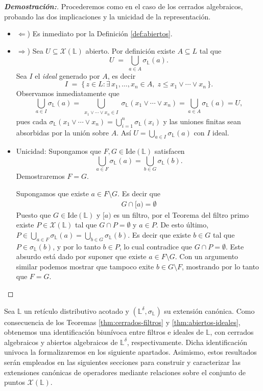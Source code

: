 \documentclass[12pt]{book}
\begin{document}
\begin{proof}[\textbf{Demostración:}]
Procederemos como en el caso de los cerrados algebraicos, probando las dos implicaciones y la unicidad de la representación.

\begin{itemize}
\item \(\Leftarrow\)) Es inmediato por la Definición \ref{def:abiertos}. 

\item \(\Rightarrow\)) Sea \(U\subseteq\mathcal{X}(\mathbb L)\) abierto.
Por definición existe \(A\subseteq L\) tal que
\[
U \;=\; \bigcup_{a\in A}\sigma_{\mathbb{L}}(a).
\]
Sea \(I\) el \emph{ideal} generado por \(A\), es decir
\[
I \;=\;
\{\,z\in L : \exists\,x_1,\dots,x_n\in A,\;
                 z \le x_1\vee\cdots\vee x_n\,\}.
\]
Observamos inmediatamente que
\[
\bigcup_{a\in I}\sigma_{\mathbb{L}}(a)
=\bigcup_{\substack{x_1\vee\cdots\vee x_n\in I}}
  \sigma_{\mathbb{L}}(x_1\vee\cdots\vee x_n)
=\bigcup_{a\in A}\sigma_{\mathbb{L}}(a)
=U,
\]
pues cada \(\sigma_{\mathbb{L}}(x_1\vee\cdots\vee x_n)=\bigcup_{i=1}^n\sigma_{\mathbb{L}}(x_i)\) y las uniones finitas
sean absorbidas por la unión sobre \(A\). Así \(U=\bigcup_{a\in I}\sigma_{\mathbb{L}}(a)\) con \(I\) ideal.

\item Unicidad: Supongamos que \(F,G\in\mathrm{Ide}(\mathbb L)\) satisfacen
\[
\bigcup_{a\in F}\sigma_{\mathbb{L}}(a)
=\bigcup_{b\in G}\sigma_{\mathbb{L}}(b).
\]
Demostraremos \(F=G\).

Supongamos que existe \(a\in F\setminus G\). Es decir que 
\begin{align*}
    G\cap[a) = \emptyset
\end{align*}
Puesto que $G\in\mathrm{Ide}(\mathbb L)$ y $[a)$ es un filtro, por el Teorema del filtro primo existe $P\in \mathcal{X}(\mathbb L)$ tal que $G\cap P= \emptyset$ y $a\in P$. De esto último, $P\in \bigcup_{a\in F} \sigma_{\mathbb{L}}(a)=\bigcup_{b\in G}\sigma_{\mathbb{L}}(b)$. Es decir que existe $b\in G$ tal que $P\in\sigma_{\mathbb{L}}(b)$, y por lo tanto $b\in P$, lo cual contradice que $G\cap P= \emptyset$. Este absurdo está dado por suponer que existe \(a\in F\setminus G\). Con un argumento similar podemos mostrar que tampoco exite  \(b\in G\setminus F\), mostrando por lo tanto que \(F=G\).
\end{itemize}
\end{proof}

Sea $\mathbb{L}$ un retículo distributivo acotado y $(\mathbb{L}^{\delta},\sigma_{\mathbb{L}})$ su extensión canónica. Como consecuencia de los Teoremas \ref{thm:cerrados-filtros} y \ref{thm:abiertos-ideales}, 
obtenemos una identificación biunívoca entre filtros e ideales de $\mathbb{L}$, con cerrados algebraicos y abiertos algebraicos de $\mathbb{L}^{\delta}$, respectivamente. Dicha identificación univoca la formalizaremos en los siguiente apartados. Asimismo, estos resultados serán empleados en las siguientes secciones para construir y caracterizar las extensiones canónicas de operadores mediante relaciones sobre el conjunto de puntos $\mathcal X(\mathbb L)$.
\end{document}
